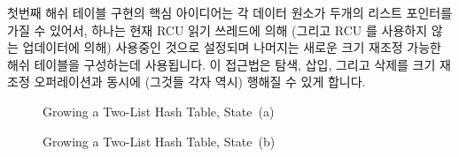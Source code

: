 첫번째 해쉬 테이블 구현의 핵심 아이디어는 각 데이터 원소가 두개의 리스트
포인터를 가질 수 있어서, 하나는 현재 RCU 읽기 쓰레드에 의해 (그리고 RCU 를
사용하지 않는 업데이터에 의해) 사용중인 것으로 설정되며 나머지는 새로운 크기
재조정 가능한 해쉬 테이블을 구성하는데 사용됩니다.
이 접근법은 탐색, 삽입, 그리고 삭제를 크기 재조정 오퍼레이션과 동시에 (그것들
각자 역시) 행해질 수 있게 합니다.

\begin{figure}[tb]
\centering
{}
\caption{Growing a Two-List Hash Table, State~(a)}
\label{fig:datastruct:Growing a Two-List Hash Table; State (a)}
\end{figure}

\begin{figure}[tb]
\centering
{}
\caption{Growing a Two-List Hash Table, State~(b)}
\label{fig:datastruct:Growing a Two-List Hash Table; State (b)}
\end{figure}


